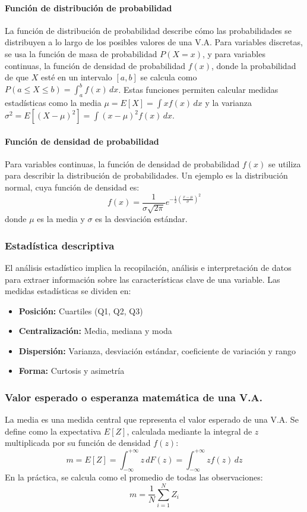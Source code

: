 \paragraph{Función de distribución de probabilidad}
La función de distribución de probabilidad describe cómo las probabilidades se distribuyen a lo largo de los posibles valores de una V.A. Para variables discretas, se usa la función de masa de probabilidad \(P(X=x)\), y para variables continuas, la función de densidad de probabilidad \(f(x)\), donde la probabilidad de que \(X\) esté en un intervalo \([a, b]\) se calcula como \(P(a \leq X \leq b) = \int_{a}^{b} f(x) \, dx\). Estas funciones permiten calcular medidas estadísticas como la media \(\mu = E[X] = \int x f(x) \, dx\) y la varianza \(\sigma^2 = E[(X-\mu)^2] = \int (x-\mu)^2 f(x) \, dx\).

\paragraph{Función de densidad de probabilidad}
Para variables continuas, la función de densidad de probabilidad \(f(x)\) se utiliza para describir la distribución de probabilidades. Un ejemplo es la distribución normal, cuya función de densidad es:
\[ f(x) = \frac{1}{\sigma\sqrt{2\pi}} e^{-\frac{1}{2}\left(\frac{x - \mu}{\sigma}\right)^2} \]
donde \(\mu\) es la media y \(\sigma\) es la desviación estándar.

\subsubsection{Estadística descriptiva}
El análisis estadístico implica la recopilación, análisis e interpretación de datos para extraer información sobre las características clave de una variable. Las medidas estadísticas se dividen en:
\begin{itemize}
    \item \textbf{Posición:} Cuartiles (Q1, Q2, Q3)
    \item \textbf{Centralización:} Media, mediana y moda
    \item \textbf{Dispersión:} Varianza, desviación estándar, coeficiente de variación y rango
    \item \textbf{Forma:} Curtosis y asimetría
\end{itemize}

\subsubsection{Valor esperado o esperanza matemática de una V.A.}
La media es una medida central que representa el valor esperado de una V.A. Se define como la expectativa \(E[Z]\), calculada mediante la integral de \(z\) multiplicada por su función de densidad \(f(z)\):
\[ m = E[Z] = \int_{-\infty}^{+\infty} z \, dF(z) = \int_{-\infty}^{+\infty} zf(z) \, dz \]
En la práctica, se calcula como el promedio de todas las observaciones:
\[ m = \frac{1}{N} \sum_{i=1}^{N} Z_i \]

